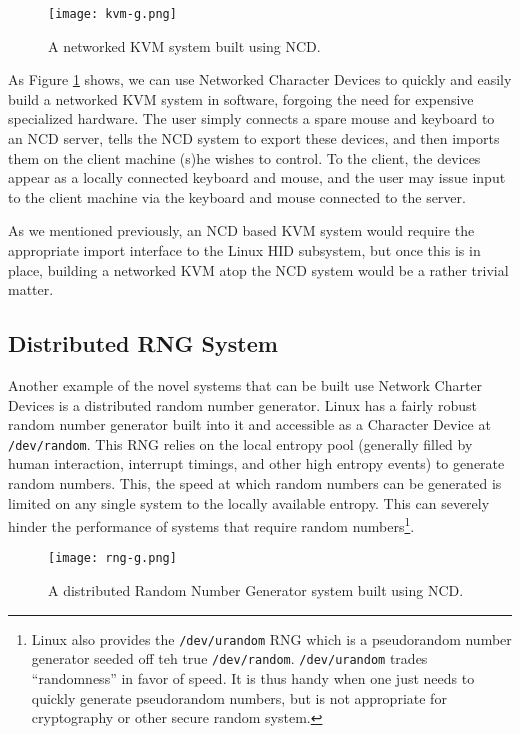 \documentclass[11pt,twocolumn]{article}
\begin{document}
\begin{figure}[h]
  \centering
  \texttt{[image: kvm-g.png]}
  \caption{A networked KVM system built using NCD.}
  \label{fig:kvm}
\end{figure}

As Figure \ref{fig:kvm} shows, we can use Networked Character Devices
to quickly and easily build a networked KVM system in software,
forgoing the need for expensive specialized hardware. The user simply
connects a spare mouse and keyboard to an NCD server, tells the NCD
system to export these devices, and then imports them on the client
machine (s)he wishes to control. To the client, the devices appear as
a locally connected keyboard and mouse, and the user may issue input to
the client machine via the keyboard and mouse connected to the
server.

As we mentioned previously, an NCD based KVM system would require the
appropriate import interface to the Linux HID subsystem, but once this is
in place, building a networked KVM atop the NCD system would be a
rather trivial matter.

\subsection{Distributed RNG System}
\label{sec:distributedrng}

Another example of the novel systems that can be built use Network
Charter Devices is a distributed random number generator. Linux has a
fairly robust random number generator built into it and accessible as
a Character Device at \texttt{/dev/random}. This RNG relies on the
local entropy pool (generally filled by human interaction, interrupt
timings, and other high entropy events) to generate random
numbers. This, the speed at which random numbers can be generated is
limited on any single system to the locally available
entropy. This can severely hinder the
performance of systems that require random numbers\footnote{Linux also
provides the \texttt{/dev/urandom} RNG which is a pseudorandom number
generator seeded off teh true
\texttt{/dev/random}. \texttt{/dev/urandom} trades ``randomness'' in
favor of speed. It is thus handy when one just needs to quickly
generate pseudorandom numbers, but is not appropriate for cryptography or
other secure random system.}.

\begin{figure}[h]
  \centering
  \texttt{[image: rng-g.png]}
  \caption{A distributed Random Number Generator system built using NCD.}
  \label{fig:rng}
\end{figure}
\end{document}
